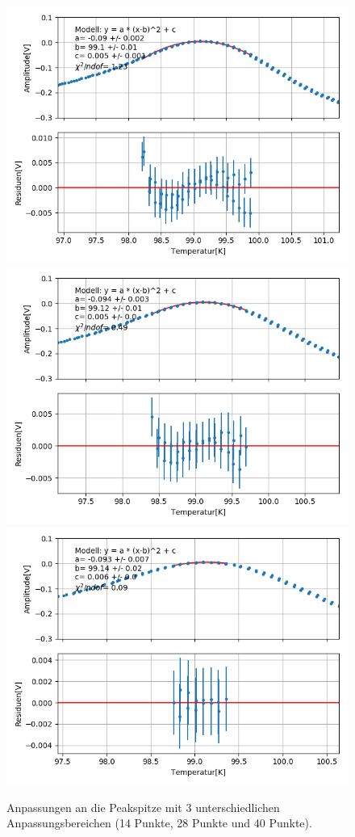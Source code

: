 \documentclass[12pt,a4paper]{article}
\begin{document}
\begin{figure}
\centering
\includegraphics[scale=0.6]{Bilder/Haupt_Supra/X2_anpassung1.png}
\includegraphics[scale=0.6]{Bilder/Haupt_Supra/X2_anpassung2.png}
\includegraphics[scale=0.6]{Bilder/Haupt_Supra/X2_anpassung3.png}

\caption{Anpassungen an die Peakspitze mit 3 unterschiedlichen Anpassungsbereichen (14 Punkte, 28 Punkte und 40 Punkte).}
\label{fig:Supra_X2anpassung}
\end{figure}
\end{document}
